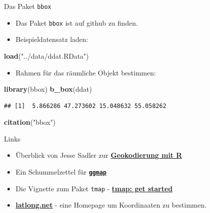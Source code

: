 \documentclass[ignorenonframetext,]{beamer}
\newenvironment{Shaded}{\begin{snugshade}}{\end{snugshade}}
\newcommand{\KeywordTok}[1]{\textcolor[rgb]{0.13,0.29,0.53}{\textbf{#1}}}
\newcommand{\NormalTok}[1]{#1}
\newcommand{\StringTok}[1]{\textcolor[rgb]{0.31,0.60,0.02}{#1}}
\providecommand{\tightlist}{%
  \setlength{\itemsep}{0pt}\setlength{\parskip}{0pt}}
\begin{document}
\begin{frame}[fragile]{Das Paket \texttt{bbox}}
\protect\hypertarget{das-paket-bbox}{}

\begin{itemize}
\item
  Das Paket \texttt{bbox} ist auf github zu finden.
\item
  Beispieldatensatz laden:
\end{itemize}

\begin{Shaded}
\begin{Highlighting}[]
\KeywordTok{load}\NormalTok{(}\StringTok{"../data/ddat.RData"}\NormalTok{)}
\end{Highlighting}
\end{Shaded}

\begin{itemize}
\tightlist
\item
  Rahmen für das räumliche Objekt bestimmen:
\end{itemize}

\begin{Shaded}
\begin{Highlighting}[]
\KeywordTok{library}\NormalTok{(bbox)}
\KeywordTok{b_box}\NormalTok{(ddat)}
\end{Highlighting}
\end{Shaded}

\begin{verbatim}
## [1]  5.866286 47.273602 15.048632 55.058262
\end{verbatim}

\begin{Shaded}
\begin{Highlighting}[]
\KeywordTok{citation}\NormalTok{(}\StringTok{"bbox"}\NormalTok{)}
\end{Highlighting}
\end{Shaded}

\end{frame}

\begin{frame}[fragile]{Links}
\protect\hypertarget{links}{}

\begin{itemize}
\item
  Überblick von Jesse Sadler zur
  \href{https://www.jessesadler.com/post/geocoding-with-r/}{\textbf{Geokodierung
  mit R}}
\item
  Ein Schummelzettel für
  \href{https://www.nceas.ucsb.edu/~frazier/RSpatialGuides/ggmap/ggmapCheatsheet.pdf}{\textbf{\texttt{ggmap}}}
\item
  Die Vignette zum Paket \texttt{tmap} -
  \href{https://cran.r-project.org/web/packages/tmap/vignettes/tmap-getstarted.html}{\textbf{tmap:
  get started}}
\item
  \href{https://www.latlong.net/place/hamburg-germany-8766.html}{\textbf{latlong.net}}
  - eine Homepage um Koordinaaten zu bestimmen.
\end{itemize}

\end{frame}
\end{document}
